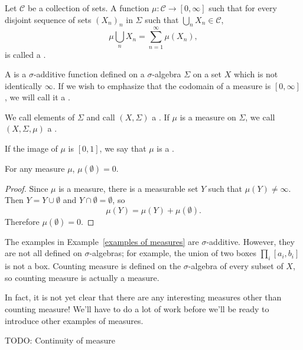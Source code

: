 \begin{definition}
Let $\mathcal C$ be a collection of sets.
A function $\mu: \mathcal C \to [0, \infty]$ such that for every disjoint sequence of sets $(X_{n})_{n}$ in $\Sigma$ such that $\bigcup_{n} X_{n} \in \mathcal C$,
\[\mu\bigcup_{n} X_{n} = \sum_{n=1}^{\infty} \mu(X_{n}),\]
is called a .
\end{definition}

\begin{definition}
A  is a $\sigma$-additive function defined on a $\sigma$-algebra $\Sigma$ on a set $X$ which is not identically $\infty$.
If we wish to emphasize that the codomain of a measure is $[0, \infty]$, we will call it a .

We call elements of $\Sigma$  and call $(X, \Sigma)$ a .
If $\mu$ is a measure on $\Sigma$, we call $(X, \Sigma, \mu)$ a .

If the image of $\mu$ is $[0, 1]$, we say that $\mu$ is a .
\end{definition}

\begin{lemma}
\label{empty set is null}
For any measure $\mu$, $\mu(\emptyset) = 0$.
\end{lemma}
\begin{proof}
Since $\mu$ is a measure, there is a measurable set $Y$ such that $\mu(Y) \neq \infty$.
Then $Y = Y \cup \emptyset$ and $Y \cap \emptyset = \emptyset$, so
\[\mu(Y) = \mu(Y) + \mu(\emptyset).\]
Therefore $\mu(\emptyset) = 0$.
\end{proof}

\begin{example}
The examples in Example~\ref{examples of measures} are $\sigma$-additive.
However, they are not all defined on $\sigma$-algebras; for example, the union of two boxes $\prod_{i} [a_i, b_i]$ is not a box.
Counting measure is defined on the $\sigma$-algebra of every subset of $X$, so counting measure is actually a measure.

In fact, it is not yet clear that there are any interesting measures other than counting measure!
We'll have to do a lot of work before we'll be ready to introduce other examples of measures.
\end{example}

\begin{theorem}
TODO: Continuity of measure
\end{theorem}

